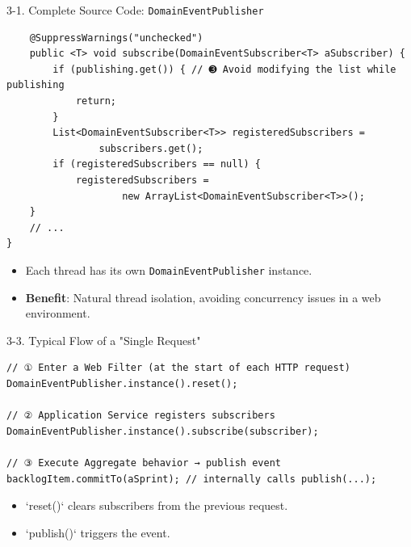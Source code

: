\documentclass{beamer}
\begin{document}
\begin{frame}[fragile]{3-1. Complete Source Code: \texttt{DomainEventPublisher}}
\begin{lstlisting}
    @SuppressWarnings("unchecked")
    public <T> void subscribe(DomainEventSubscriber<T> aSubscriber) {
        if (publishing.get()) { // ➌ Avoid modifying the list while publishing
            return;
        }
        List<DomainEventSubscriber<T>> registeredSubscribers =
                subscribers.get();
        if (registeredSubscribers == null) {
            registeredSubscribers =
                    new ArrayList<DomainEventSubscriber<T>>();
    }
    // ...
}
  \end{lstlisting}
  \begin{itemize}
    \item Each thread has its own \texttt{DomainEventPublisher} instance.
    \item \textbf{Benefit}: Natural thread isolation, avoiding concurrency issues in a web environment.
  \end{itemize}
\end{frame}

\begin{frame}[fragile]{3-3. Typical Flow of a "Single Request"}
  \lstset{language=Java, basicstyle=\ttfamily\scriptsize}
  \begin{lstlisting}
// ① Enter a Web Filter (at the start of each HTTP request)
DomainEventPublisher.instance().reset();

// ② Application Service registers subscribers
DomainEventPublisher.instance().subscribe(subscriber);

// ③ Execute Aggregate behavior → publish event
backlogItem.commitTo(aSprint); // internally calls publish(...);
  \end{lstlisting}
  \begin{itemize}
    \item `reset()` clears subscribers from the previous request.
    \item `publish()` triggers the event.
  \end{itemize}
\end{frame}
\end{document}
